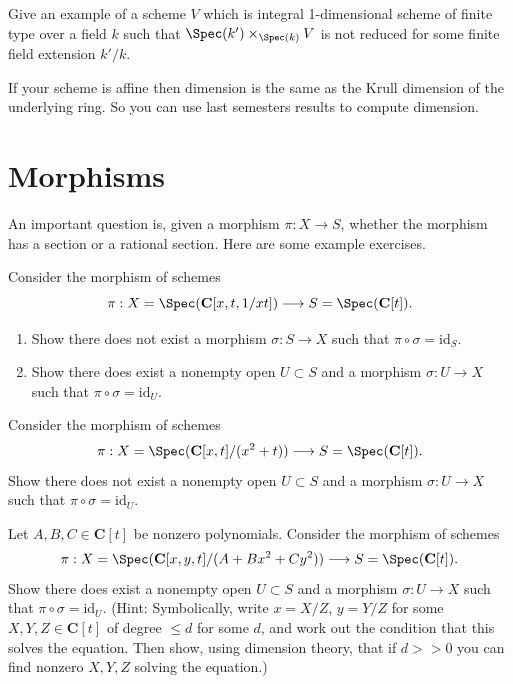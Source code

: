 \begin{exercise}
\label{exercise-not-geometrically-reduced}
Give an example of a scheme
$V$ which is integral 1-dimensional scheme of finite type
over a field $k$ such that $\Spec(k') \times_{\Spec(k)} V$
is not reduced for some finite field extension $k'/k$.
\end{exercise}

\begin{remark}
\label{remark-affine-dimension}
If your scheme is affine then dimension is the
same as the Krull dimension of the underlying ring. So you can
use last semesters results to compute dimension.
\end{remark}






\section{Morphisms}
\label{section-morphisms}

\noindent
An important question is, given a morphism $\pi : X \to S$,
whether the morphism has a section or a rational section.
Here are some example exercises.

\begin{exercise}
\label{exercise-no-section}
Consider the morphism of schemes
$$
\pi :
X = \Spec(\mathbf{C}[x, t, 1/xt])
\longrightarrow
S = \Spec(\mathbf{C}[t]).
$$
\begin{enumerate}
\item Show there does not exist a morphism $\sigma : S \to X$
such that $\pi \circ \sigma = \text{id}_S$.
\item Show there does exist a nonempty open $U \subset S$ and
a morphism $\sigma : U \to X$ such that $\pi \circ \sigma = \text{id}_U$.
\end{enumerate}
\end{exercise}

\begin{exercise}
\label{exercise-no-rational-section}
Consider the morphism of schemes
$$
\pi :
X = \Spec(\mathbf{C}[x, t]/(x^2 + t))
\longrightarrow
S = \Spec(\mathbf{C}[t]).
$$
Show there does not exist a nonempty open $U \subset S$ and
a morphism $\sigma : U \to X$ such that $\pi \circ \sigma = \text{id}_U$.
\end{exercise}

\begin{exercise}
\label{exercise-has-rational-section}
Let $A, B, C \in \mathbf{C}[t]$ be nonzero polynomials.
Consider the morphism of schemes
$$
\pi :
X = \Spec(\mathbf{C}[x, y, t]/(A + Bx^2 + Cy^2))
\longrightarrow
S = \Spec(\mathbf{C}[t]).
$$
Show there does exist a nonempty open $U \subset S$ and
a morphism $\sigma : U \to X$ such that $\pi \circ \sigma = \text{id}_U$.
(Hint: Symbolically, write $x = X/Z$, $y = Y/Z$ for some
$X, Y, Z \in \mathbf{C}[t]$ of degree $\leq d$ for some $d$,
and work out the condition that this solves the equation.
Then show, using dimension theory, that if $d >> 0$ you can find
nonzero $X, Y, Z$ solving the equation.)
\end{exercise}

